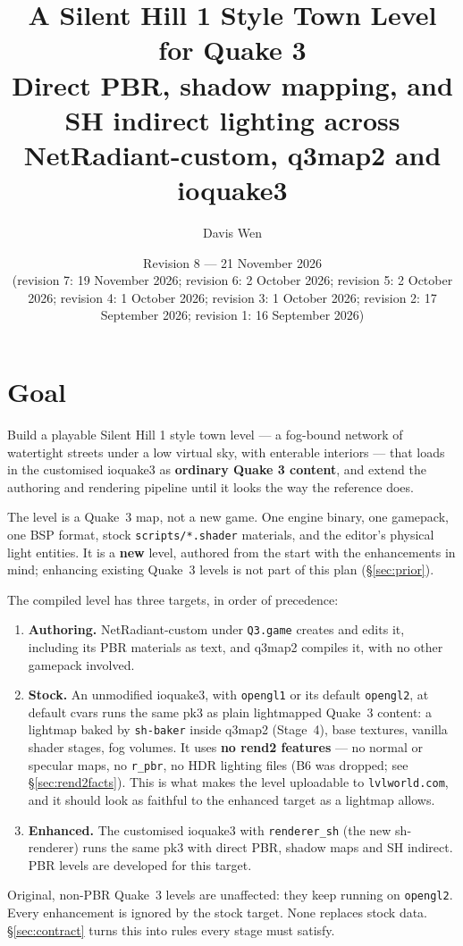 \documentclass[11pt,a4paper]{article}
\title{A Silent Hill 1 Style Town Level for Quake 3\\
\large Direct PBR, shadow mapping, and SH indirect lighting across
NetRadiant-custom, q3map2 and ioquake3}
\author{Davis Wen}
\date{Revision 8 --- 21 November 2026\\
\small (revision 7: 19 November 2026; revision 6: 2 October 2026; revision 5: 2 October 2026; revision 4: 1 October 2026; revision 3: 1 October 2026; revision 2: 17 September 2026;
revision 1: 16 September 2026)}
\begin{document}
\maketitle

\section{Goal}

Build a playable Silent Hill 1 style town level --- a fog-bound network of watertight streets
under a low virtual sky, with enterable interiors --- that loads in the customised ioquake3 as
\textbf{ordinary Quake 3 content}, and extend the authoring and rendering pipeline until it looks
the way the reference does.

The level is a Quake~3 map, not a new game. One engine binary, one gamepack, one BSP format, stock
\texttt{scripts/*.shader} materials, and the editor's physical light entities. It is a \textbf{new} level, authored
from the start with the enhancements in mind; enhancing existing Quake~3 levels is not part of this
plan (§\ref{sec:prior}).

The compiled level has three targets, in order of precedence:
\begin{enumerate}
\item \textbf{Authoring.} NetRadiant-custom under \texttt{Q3.game} creates and edits it, including
  its PBR materials as text, and q3map2 compiles it, with no other gamepack involved.
\item \textbf{Stock.} An unmodified ioquake3, with \texttt{opengl1} or its default
  \texttt{opengl2}, at default cvars runs the same pk3 as plain lightmapped Quake~3 content:
  a lightmap baked by \texttt{sh-baker} inside q3map2 (Stage~4), base textures, vanilla shader
  stages, fog volumes. It uses \textbf{no rend2
  features} --- no normal or specular maps, no \texttt{r\_pbr}, no HDR lighting files (B6 was dropped; see §\ref{sec:rend2facts}). This is what makes
  the level uploadable to \texttt{lvlworld.com}, and it should look as faithful to the enhanced
  target as a lightmap allows.
\item \textbf{Enhanced.} The customised ioquake3 with \texttt{renderer\_sh} (the new sh-renderer)
  runs the same pk3 with direct PBR, shadow maps and SH indirect. PBR levels are developed for
  this target.
\end{enumerate}
Original, non-PBR Quake~3 levels are unaffected: they keep running on \texttt{opengl2}. Every
enhancement is ignored by the stock target. None replaces stock data. §\ref{sec:contract} turns this
into rules every stage must satisfy.
\end{document}
